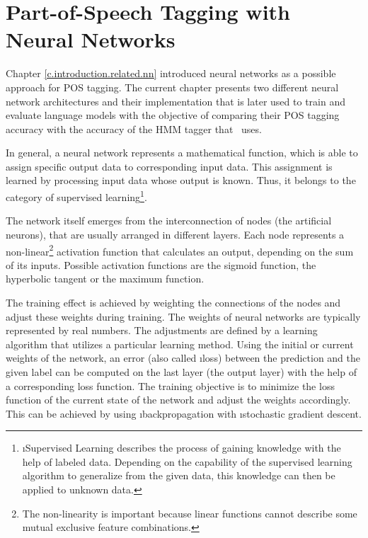 \chapter{Part-of-Speech Tagging with Neural Networks}\label{c.postagging}
Chapter \ref{c.introduction.related.nn} introduced neural networks as a possible approach for POS tagging. The current chapter presents two different neural network architectures and their implementation that is later used to train and evaluate language models with the objective of comparing their POS tagging accuracy with the accuracy of the HMM tagger that \Alex\ uses.

In general, a neural network represents a mathematical function, which is able to assign specific output data to corresponding input data. This assignment is learned by processing input data whose output is known. Thus, it belongs to the category of supervised learning\footnote{\i{Supervised Learning} describes the process of gaining knowledge with the help of labeled data. Depending on the capability of the supervised learning algorithm to generalize from the given data, this knowledge can then be applied to unknown data.}.

The network itself emerges from the interconnection of nodes (the artificial neurons), that are usually arranged in different layers. Each node represents a non-linear\footnote{The non-linearity is important because linear functions cannot describe some mutual exclusive feature combinations.} activation function that calculates an output, depending on the sum of its inputs. Possible activation functions are the sigmoid function, the hyperbolic tangent or the maximum function.

The training effect is achieved by weighting the connections of the nodes and adjust these weights during training. The weights of neural networks are typically represented by real numbers. The adjustments are defined by a learning algorithm that utilizes a particular learning method. Using the initial or current weights of the network, an error (also called \i{loss}) between the prediction and the given label can be computed on the last layer (the output layer) with the help of a corresponding loss function. The training objective is to minimize the loss function of the current state of the network and adjust the weights accordingly. This can be achieved by using \i{backpropagation} with \i{stochastic gradient descent}.

